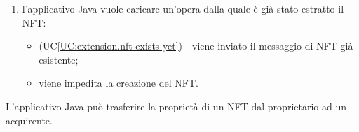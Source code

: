 \begin{itemize}
\begin{enumerate}[label=\lett]
    \item l'applicativo Java vuole caricare un'opera dalla quale è già stato estratto il NFT:
    \begin{itemize}
      \item (UC\ref{UC:extension.nft-exists-yet}) - viene inviato il messaggio di NFT già esistente;
      \item viene impedita la creazione del NFT.
    \end{itemize}
  \end{enumerate}
\end{itemize}


\label{UC:transfer-nft}

L'applicativo Java può trasferire la proprietà di un NFT dal proprietario ad un acquirente.

